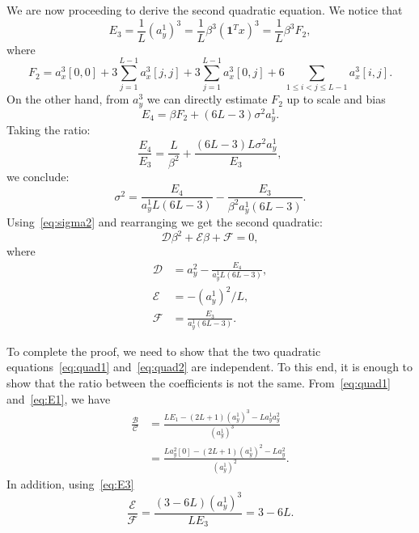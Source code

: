 \documentclass[english,11pt]{article}
\numberwithin{equation}{section}
\theoremstyle{plain}
\theoremstyle{definition}
\theoremstyle{remark}
\theoremstyle{plain}
\theoremstyle{remark}
\theoremstyle{plain}
\theoremstyle{plain}
\newcommand{\one}{\mathbf{1}}
\begin{document}
We are now proceeding to derive the second quadratic equation. We notice that 
\begin{equation} \label{eq:E3}
E_3  = \frac{1}{L}(a_y^1)^3 = \frac{1}{L}\beta^3 (\one ^Tx)^3   = \frac{1}{L}\beta^3 F_2,
\end{equation}
where 
\begin{equation*}
F_2 =  a_x^3[0,0] + 3\sum_{j=1}^{L-1}a_x^3[j,j] + 3\sum_{j=1}^{L-1}a_x^3[0,j] + 6\sum_{1\leq i < j\leq L-1}a_x^3[i,j].
\end{equation*}
On the other hand, from $a_y^3$ we can directly estimate $F_2$ up to scale and bias
\begin{equation} \label{eq:E4}
E_4 = \beta F_2 + (6L-3)\sigma^2a_y^1.
\end{equation}
Taking the ratio:
\begin{equation*} 
\frac{E_4}{E_3} = \frac{L}{\beta^2} + \frac{(6L-3)L\sigma^2a_y^1}{E_3}, 
\end{equation*}
we conclude:
\begin{equation*}
\sigma^2 = \frac{E_4}{a_y^1L(6L-3)}  - \frac{E_3}{\beta^2a_y^1(6L-3)}.
\end{equation*}
Using~\eqref{eq:sigma2} and rearranging we get the second quadratic:
\begin{equation} \label{eq:quad2}
\mathcal{D}\beta^2 + \mathcal{E}\beta + \mathcal{F} = 0,
\end{equation}
where
\begin{align*}
\mathcal{D} &= a_y^2 - \frac{E_4}{a_y^1L(6L-3)}, \\ 
\mathcal{E} &= -(a_y^1)^2/L, \\
\mathcal{F} &= \frac{E_3}{a_y^1(6L-3)}.
\end{align*}

To complete the proof, we need to show that the two quadratic equations~\eqref{eq:quad1} and~\eqref{eq:quad2} are independent. To this end, it is enough to show that the ratio between the coefficients is not the same. 
From~\eqref{eq:quad1} and~\eqref{eq:E1}, we have 
\begin{equation*}
\begin{split}
\frac{\mathcal{B}}{\mathcal{C}} &= \frac{LE_1 - (2L+1)(a_y^1)^3 - La_y^1a_y^2}{(a_y^1)^3} \\&= \frac{La_y^2[0] - (2L+1)(a_y^1)^2 - La_y^2}{(a_y^1)^2}.
\end{split}
\end{equation*}
In addition, using~\eqref{eq:E3}
\begin{equation*}
\frac{\mathcal{E}}{\mathcal{F}} = \frac{(3-6L)(a_y^1)^3}{LE_3} = 3 - 6L . 
\end{equation*}
\end{document}
